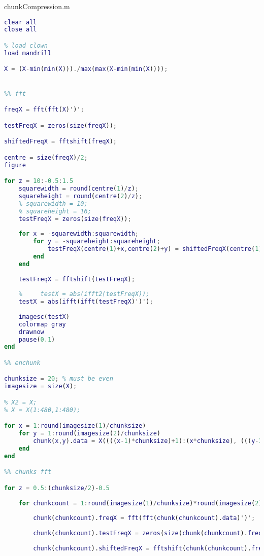 chunkCompression.m
\begin{lstlisting}[language=Matlab, label = lst:chunk_comp, caption = {Secioned image, transform based compression code}]
clear all
close all

% load clown
load mandrill

X = (X-min(min(X)))./max(max(X-min(min(X))));


%% fft

freqX = fft(fft(X)')';

testFreqX = zeros(size(freqX));

shiftedFreqX = fftshift(freqX);

centre = size(freqX)/2;
figure

for z = 10:-0.5:1.5
    squarewidth = round(centre(1)/z);
    squareheight = round(centre(2)/z);
    % squarewidth = 10;
    % squareheight = 16;
    testFreqX = zeros(size(freqX));
    
    for x = -squarewidth:squarewidth;
        for y = -squareheight:squareheight;
            testFreqX(centre(1)+x,centre(2)+y) = shiftedFreqX(centre(1)+x,centre(2)+y);
        end
    end
    
    testFreqX = fftshift(testFreqX);
    
    %     testX = abs(ifft2(testFreqX));
    testX = abs(ifft(ifft(testFreqX)')');
    
    imagesc(testX)
    colormap gray
    drawnow
    pause(0.1)
end

%% enchunk

chunksize = 20; % must be even
imagesize = size(X);

% X2 = X;
% X = X(1:480,1:480);

for x = 1:round(imagesize(1)/chunksize)
    for y = 1:round(imagesize(2)/chunksize)
        chunk(x,y).data = X((((x-1)*chunksize)+1):(x*chunksize), (((y-1)*chunksize)+1):(y*chunksize));
    end
end

%% chunks fft

for z = 0.5:(chunksize/2)-0.5
    
    for chunkcount = 1:round(imagesize(1)/chunksize)*round(imagesize(2)/chunksize)
        
        chunk(chunkcount).freqX = fft(fft(chunk(chunkcount).data)')';
        
        chunk(chunkcount).testFreqX = zeros(size(chunk(chunkcount).freqX));
        
        chunk(chunkcount).shiftedFreqX = fftshift(chunk(chunkcount).freqX);
        

\end{lstlisting}
